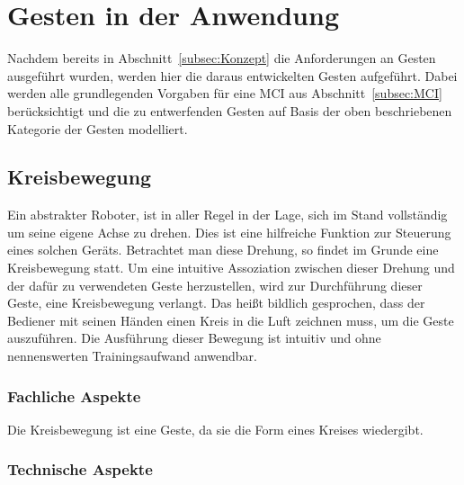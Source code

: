 \section{Gesten in der Anwendung}

Nachdem bereits in Abschnitt~\ref{subsec:Konzept} die Anforderungen an Gesten ausgef\"uhrt wurden, werden hier die daraus entwickelten Gesten aufgef\"uhrt. Dabei werden alle grundlegenden Vorgaben f\"ur eine \gls{MCI} aus Abschnitt~\ref{subsec:MCI} ber\"ucksichtigt und die zu entwerfenden Gesten auf Basis der oben beschriebenen Kategorie der  Gesten modelliert.

\subsection{Kreisbewegung}
Ein abstrakter Roboter, ist in aller Regel in der Lage, sich im Stand vollst\"andig um seine eigene Achse zu drehen. Dies ist eine hilfreiche Funktion zur Steuerung eines solchen Ger\"ats. Betrachtet man diese Drehung, so findet im Grunde eine Kreisbewegung statt. Um eine intuitive Assoziation zwischen dieser Drehung und der daf\"ur zu verwendeten Geste herzustellen, wird zur Durchf\"uhrung dieser Geste, eine Kreisbewegung verlangt. Das hei\ss t bildlich gesprochen, dass der Bediener mit seinen H\"anden einen Kreis in die Luft zeichnen muss, um die Geste auszuf\"uhren.
\newline
Die Ausf\"uhrung dieser Bewegung ist intuitiv und ohne nennenswerten Trainingsaufwand anwendbar.

\subsubsection{Fachliche Aspekte}
Die Kreisbewegung ist eine  Geste, da sie die Form eines Kreises wiedergibt. 

\subsubsection{Technische Aspekte}


